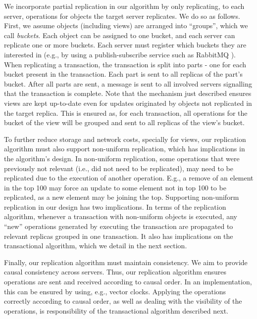 We incorporate partial replication in our algorithm by only replicating, to each server, operations for objects the target server replicates.
We do so as follows.
First, we assume objects (including views) are arranged into ``groups'', which we call \emph{buckets}.
Each object can be assigned to one bucket, and each server can replicate one or more buckets.
Each server must register which buckets they are interested in (e.g., by using a publish-subscribe service such as RabbitMQ \cite{???}).
When replicating a transaction, the transaction is split into parts - one for each bucket present in the transaction.
Each part is sent to all replicas of the part's bucket.
After all parts are sent, a message is sent to all involved servers signalling that the transaction is complete.
Note that the mechanism just described ensures views are kept up-to-date even for updates originated by objects not replicated in the target replica.
This is ensured as, for each transaction, all operations for the bucket of the view will be grouped and sent to all replicas of the view's bucket.


To further reduce storage and network costs, specially for views, our replication algorithm must also support non-uniform replication, which has implications in the algorithm's design.
In non-uniform replication, some operations that were previously not relevant (i.e., did not need to be replicated), may need to be replicated due to the execution of another operation.
E.g., a remove of an element in the top 100 may force an update to some element not in top 100 to be replicated, as a new element may be joining the top.
Supporting non-uniform replication in our design has two implications.
In terms of the replication algorithm, whenever a transaction with non-uniform objects is executed, any ``new'' operations generated by executing the transaction are propagated to relevant replicas grouped in one transaction.
It also has implications on the transactional algorithm, which we detail in the next section.

Finally, our replication algorithm must maintain consistency.
We aim to provide causal consistency across servers.
Thus, our replication algorithm ensures operations are sent and received according to causal order.
In an implementation, this can be ensured by using, e.g., vector clocks.
Applying the operations correctly according to causal order, as well as dealing with the visibility of the operations, is responsibility of the transactional algorithm described next.

